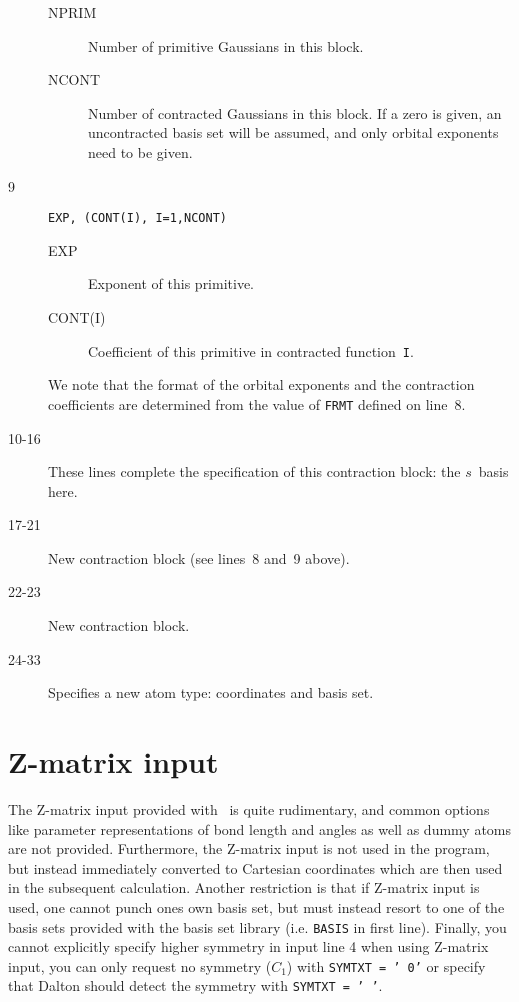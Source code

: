 \begin{description}
\begin{description}
\item[NPRIM] Number of primitive
Gaussians in this block.
\item[NCONT] Number of contracted
Gaussians in this block. If a zero
is given, an uncontracted basis set will be assumed, and only orbital
exponents need to be given.
\end{description}
\item[9] \verb|EXP, (CONT(I), I=1,NCONT)|
\begin{description}
\item[EXP] Exponent of this primitive.
\item[CONT(I)] Coefficient of this primitive in contracted
function~{\tt I}.
\end{description}
We note that the format of the orbital exponents 
and the contraction
coefficients are determined from the value of {\tt FRMT} defined on
line~8.
\item[10-16] These lines complete the specification of this
contraction block: the $s$~basis here.
\item[17-21] New contraction block (see lines~8 and~9 above).
\item[22-23] New contraction block.
\item[24-33] Specifies a new atom type: coordinates and basis set.
\end{description}

\section{Z-matrix input}\label{sec:molzmat}

The Z-matrix input provided with \dalton\ is quite rudimentary, and
common options like parameter representations of bond length and
angles as well as dummy atoms are not provided. Furthermore,
the Z-matrix input is not used in the program, but instead immediately
converted to Cartesian coordinates which are then used in the
subsequent calculation.
Another restriction is that if Z-matrix input is used, one cannot
punch ones own basis set, but must instead resort to one of the basis sets
provided with the basis set library (i.e. {\tt BASIS} in first line).
Finally, you cannot explicitly specify higher symmetry in input line 4
when using Z-matrix input,
you can only request no symmetry ($C_1$) with {\tt SYMTXT = ' 0'}
or specify that Dalton should detect the symmetry with {\tt SYMTXT = '  '}.

